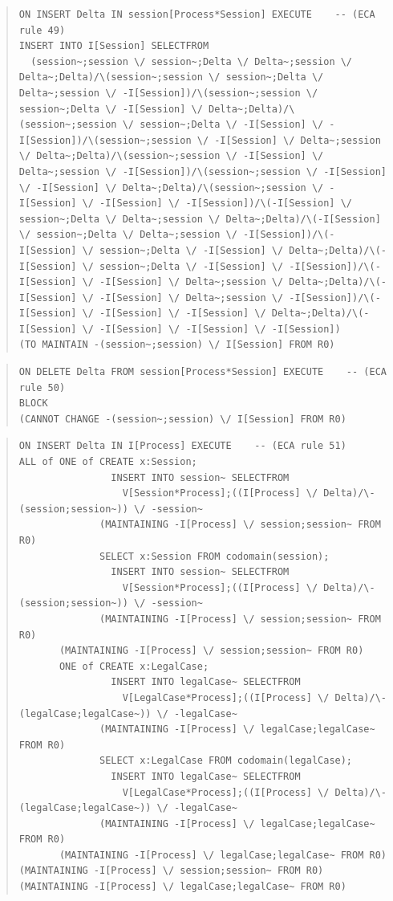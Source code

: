 \documentclass[10pt,a4paper]{report}              %
\theoremstyle{plain}\theorembodyfont{\rmfamily}\newtheorem{definition}{Definition}[section]
\theoremstyle{plain}\theorembodyfont{\rmfamily}\newtheorem{designrule}[definition]{Requirement}
\begin{document}
\begin{quote}
\begin{verbatim}
ON INSERT Delta IN session[Process*Session] EXECUTE    -- (ECA rule 49)
INSERT INTO I[Session] SELECTFROM
  (session~;session \/ session~;Delta \/ Delta~;session \/ Delta~;Delta)/\(session~;session \/ session~;Delta \/ Delta~;session \/ -I[Session])/\(session~;session \/ session~;Delta \/ -I[Session] \/ Delta~;Delta)/\(session~;session \/ session~;Delta \/ -I[Session] \/ -I[Session])/\(session~;session \/ -I[Session] \/ Delta~;session \/ Delta~;Delta)/\(session~;session \/ -I[Session] \/ Delta~;session \/ -I[Session])/\(session~;session \/ -I[Session] \/ -I[Session] \/ Delta~;Delta)/\(session~;session \/ -I[Session] \/ -I[Session] \/ -I[Session])/\(-I[Session] \/ session~;Delta \/ Delta~;session \/ Delta~;Delta)/\(-I[Session] \/ session~;Delta \/ Delta~;session \/ -I[Session])/\(-I[Session] \/ session~;Delta \/ -I[Session] \/ Delta~;Delta)/\(-I[Session] \/ session~;Delta \/ -I[Session] \/ -I[Session])/\(-I[Session] \/ -I[Session] \/ Delta~;session \/ Delta~;Delta)/\(-I[Session] \/ -I[Session] \/ Delta~;session \/ -I[Session])/\(-I[Session] \/ -I[Session] \/ -I[Session] \/ Delta~;Delta)/\(-I[Session] \/ -I[Session] \/ -I[Session] \/ -I[Session])
(TO MAINTAIN -(session~;session) \/ I[Session] FROM R0)
\end{verbatim}
\end{quote}
\begin{quote}
\begin{verbatim}
ON DELETE Delta FROM session[Process*Session] EXECUTE    -- (ECA rule 50)
BLOCK
(CANNOT CHANGE -(session~;session) \/ I[Session] FROM R0)
\end{verbatim}
\end{quote}
\begin{quote}
\begin{verbatim}
ON INSERT Delta IN I[Process] EXECUTE    -- (ECA rule 51)
ALL of ONE of CREATE x:Session;
                INSERT INTO session~ SELECTFROM
                  V[Session*Process];((I[Process] \/ Delta)/\-(session;session~)) \/ -session~
              (MAINTAINING -I[Process] \/ session;session~ FROM R0)
              SELECT x:Session FROM codomain(session);
                INSERT INTO session~ SELECTFROM
                  V[Session*Process];((I[Process] \/ Delta)/\-(session;session~)) \/ -session~
              (MAINTAINING -I[Process] \/ session;session~ FROM R0)
       (MAINTAINING -I[Process] \/ session;session~ FROM R0)
       ONE of CREATE x:LegalCase;
                INSERT INTO legalCase~ SELECTFROM
                  V[LegalCase*Process];((I[Process] \/ Delta)/\-(legalCase;legalCase~)) \/ -legalCase~
              (MAINTAINING -I[Process] \/ legalCase;legalCase~ FROM R0)
              SELECT x:LegalCase FROM codomain(legalCase);
                INSERT INTO legalCase~ SELECTFROM
                  V[LegalCase*Process];((I[Process] \/ Delta)/\-(legalCase;legalCase~)) \/ -legalCase~
              (MAINTAINING -I[Process] \/ legalCase;legalCase~ FROM R0)
       (MAINTAINING -I[Process] \/ legalCase;legalCase~ FROM R0)
(MAINTAINING -I[Process] \/ session;session~ FROM R0)
(MAINTAINING -I[Process] \/ legalCase;legalCase~ FROM R0)
\end{verbatim}
\end{quote}
\end{document}

